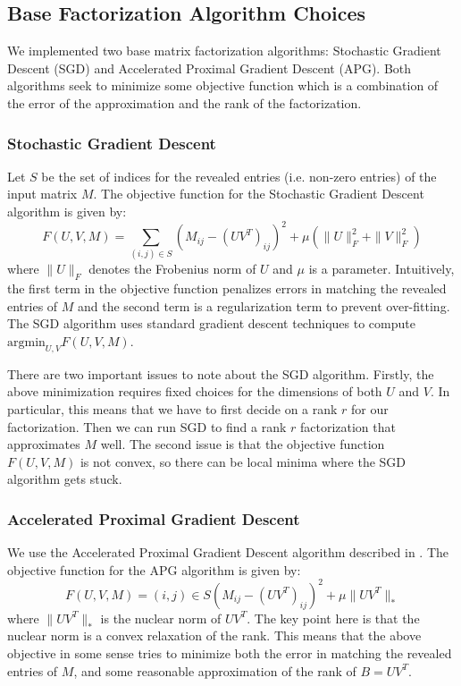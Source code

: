 \subsection{Base Factorization Algorithm Choices}
We implemented two base matrix factorization algorithms: Stochastic Gradient Descent (SGD) and Accelerated Proximal Gradient Descent (APG). Both algorithms seek to minimize some objective function which is a combination of the error of the approximation and the rank of the factorization.
\subsubsection{Stochastic Gradient Descent}
Let $S$ be the set of indices for the revealed entries (i.e. non-zero entries) of the input matrix $M$. The objective function for the Stochastic Gradient Descent algorithm is given by:
\[
F(U,V,M) = \sum_{(i,j)\in S} \left(M_{ij} - (UV^T)_{ij}\right)^2 + \mu (\| U\|^2_F  + \| V\|^2_F)
\]
where $\|U\|_F$ denotes the Frobenius norm of $U$ and $\mu$ is a parameter. Intuitively, the first term in the objective function penalizes errors in matching the revealed entries of $M$ and the second term is a regularization term to prevent over-fitting. The SGD algorithm uses standard gradient descent techniques to compute $\mbox{argmin}_{U,V} F(U,V,M)$. 

There are two important issues to note about the SGD algorithm. Firstly, the above minimization requires fixed choices for the dimensions of both $U$ and $V$. In particular, this means that we have to first decide on a rank $r$ for our factorization. Then we can run SGD to find a rank $r$ factorization that approximates $M$ well. The second issue is that the objective function $F(U,V,M)$ is not convex, so there can be local minima where the SGD algorithm gets stuck.

\subsubsection{Accelerated Proximal Gradient Descent}
We use the Accelerated Proximal Gradient Descent algorithm described in \cite{APGPaper}. The objective function for the APG algorithm is given by:
\[
F(U,V,M) = {(i,j)\in S} \left(M_{ij} - (UV^T)_{ij}\right)^2 + \mu \| UV^T\|_*
\]
where $\|UV^T\|_*$ is the nuclear norm of $UV^T$. The key point here is that the nuclear norm is a convex relaxation of the rank. This means that the above objective in some sense tries to minimize both the error in matching the revealed entries of $M$, and some reasonable approximation of the rank of $B=UV^T$.

